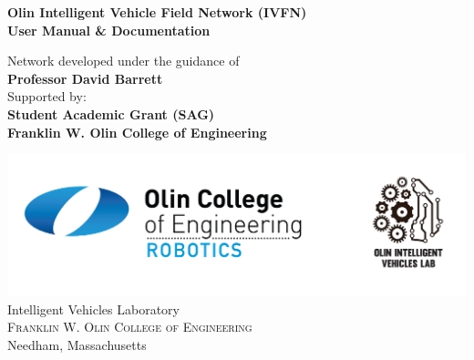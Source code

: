 \begin{titlepage}

\begin{center}

\vfill

\LARGE \textbf {Olin Intelligent Vehicle Field Network (IVFN)}\\
\LARGE \textbf {User Manual \& Documentation}\\[0.5in]

\small %
\small %

\vspace{.1in}
Network developed under the guidance of\\
{\textbf{Professor David Barrett}}\\[0.2in]

\vspace{.1in}
Supported by:\\
{\textbf{Student Academic Grant (SAG) \\ Franklin W. Olin College of Engineering}}\\[0.2in]

\vfill

\includegraphics[scale=0.17]{Logos.jpg}
\Large{Intelligent Vehicles Laboratory}\\
\normalsize
\textsc{Franklin W. Olin College of Engineering}\\
Needham, Massachusetts \\


\end{center}

\end{titlepage}

